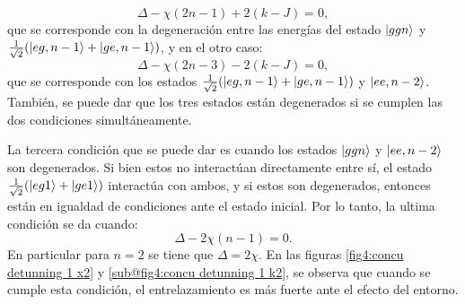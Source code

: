 \begin{equation}
    \Delta-\chi(2n-1)+2(k-J)=0,
    \label{ec4:condicion 1}
\end{equation}
que se corresponde con la degeneración entre las energías del estado $\ket{ggn}$ y $\frac{1}{\sqrt{2}}(\ket{eg,n-1}+\ket{ge,n-1})$, y en el otro caso:
\begin{equation}
    \Delta-\chi(2n-3)-2(k-J)=0,
    \label{ec4:condicion 2}
\end{equation}
que se corresponde con los estados $\frac{1}{\sqrt{2}}(\ket{eg,n-1}+\ket{ge,n-1})$ y $\ket{ee,n-2}$. También, se puede dar que los tres estados están degenerados si se cumplen las dos condiciones simultáneamente.

La tercera condición que se puede dar es cuando los estados $\ket{ggn}$ y $\ket{ee,n-2}$ son degenerados. Si bien estos no interactúan directamente entre sí, el estado $\frac{1}{\sqrt{2}}(\ket{eg1}+\ket{ge1})$ interactúa con ambos, y si estos son degenerados, entonces están en igualdad de condiciones ante el estado inicial. Por lo tanto, la ultima condición se da cuando: 
\begin{equation}
    \Delta-2\chi(n-1)=0.
    \label{ec4:condicion 3}
\end{equation}
En particular para $n=2$ se tiene que $\Delta=2\chi$. En las figuras \ref{fig4:concu detunning 1 x2} y \ref{sub@fig4:concu detunning 1 k2}, se observa que cuando se cumple esta condición, el entrelazamiento es más fuerte ante el efecto del entorno.  


